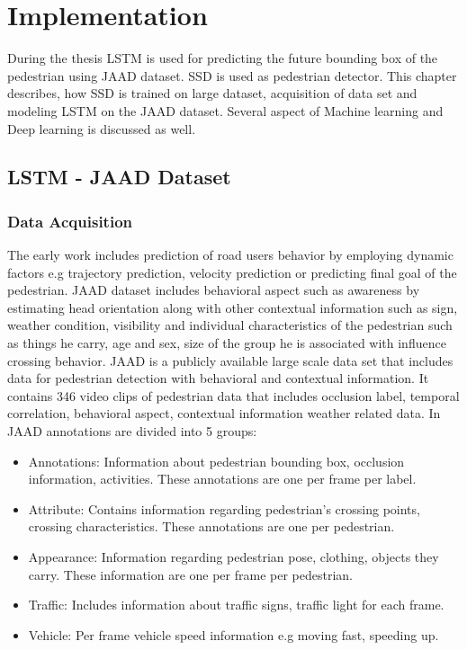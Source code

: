 \chapter{Implementation}
During the thesis LSTM is used for predicting the future bounding box of the pedestrian using JAAD dataset. SSD is used as pedestrian detector. This chapter describes, how SSD is trained on large dataset, acquisition of data set and modeling LSTM on the JAAD dataset. Several aspect of Machine learning and Deep learning is discussed as well.

\section{LSTM - JAAD Dataset}
\subsection{Data Acquisition}
The early work includes prediction of road users behavior by employing dynamic factors e.g trajectory prediction, velocity prediction or predicting final goal of the pedestrian. JAAD dataset includes  behavioral aspect such as awareness by estimating head orientation along with other contextual information such as sign, weather condition, visibility and individual characteristics of the pedestrian such as things he carry, age and sex, size of the group he is associated with influence crossing behavior. JAAD is a publicly available large scale data set that includes data for pedestrian detection with behavioral and contextual information. It contains 346 video clips of pedestrian data that includes occlusion label, temporal correlation, behavioral aspect, contextual information weather related data.
In JAAD annotations are divided into 5 groups:
\begin{itemize}
	\item Annotations: Information about pedestrian bounding box, occlusion information, activities. These annotations are one per frame per label.
	\item Attribute: Contains information regarding pedestrian's crossing points, crossing characteristics. These annotations are one per pedestrian.
	\item Appearance: Information regarding pedestrian pose, clothing, objects they carry. These information are one per frame per pedestrian.
	\item Traffic: Includes information about traffic signs, traffic light for each frame.
	\item Vehicle: Per frame vehicle speed information e.g moving fast, speeding up.
\end{itemize}


